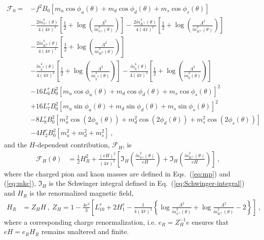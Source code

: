 \documentclass[12pt]{elsarticle}
\begin{document}
\begin{equation}
\begin{split}
\label{eq:F0}
\mathcal{F}_{0}=&-f^{2}B_{0}[m_{u}\cos\phi_{u}(\theta)+m_{d}\cos\phi_{d}(\theta)+m_{s}\cos\phi_{s}(\theta)]\\
&-\frac{2\mathring{m}^{4}_{\pi^{\pm}}(\theta)}{4(4\pi)^{2}}\left [\frac{1}{2}+\log\left (\frac{\Lambda^{2}}{\mathring{m}_{\pi^{\pm}}^{2}(\theta)} \right ) \right ]-\frac{2\mathring{m}_{K^{\pm}}^{4}(\theta)}{4(4\pi)^{2}}\left [\frac{1}{2}+\log\left (\frac{\Lambda^{2}}{\mathring{m}_{K^{\pm}}^{2}(\theta)} \right ) \right ]\\
&-\frac{2\mathring{m}_{K^{0}}^{4}(\theta)}{4(4\pi)^{2}}\left [\frac{1}{2}+\log\left (\frac{\Lambda^{2}}{\mathring{m}_{K^{0}}^{2}(\theta)} \right ) \right ]\\
&-\frac{\mathring{m}_{\tilde{\pi}^{0}}^{4}(\theta)}{4(4\pi)^{2}}\left [\frac{1}{2}+\log\left (\frac{\Lambda^{2}}{\mathring{m}_{\tilde{\pi}^{0}}^{2}(\theta)} \right ) \right ]-\frac{\mathring{m}_{\tilde{\eta}}^{4}(\theta)}{4(4\pi)^{2}}\left [\frac{1}{2}+\log\left (\frac{\Lambda^{2}}{\mathring{m}_{\tilde{\eta}}^{2}(\theta)} \right ) \right ]\\
&-16L^{r}_{6}B_{0}^{2}[m_{u}\cos\phi_{u}(\theta)+m_{d}\cos\phi_{d}(\theta)+m_{s}\cos\phi_{s}(\theta)]^{2}\\
&+16L^{r}_{7}B_{0}^{2}[m_{u}\sin\phi_{u}(\theta)+m_{d}\sin\phi_{d}(\theta)+m_{s}\sin\phi_{s}(\theta)]^{2}\\
&-8L^{r}_{8}B_{0}^{2}\left[m_{u}^{2}\cos(2\phi_{u}(\theta))+m_{d}^{2}\cos(2\phi_{d}(\theta))+m_{s}^{2}\cos(2\phi_{s}(\theta))\right]\\
&-4H^{r}_{2}B_{0}^{2}\left[m_{u}^{2}+m_{d}^{2}+m_{s}^{2}\right]\ ,
\end{split}
\end{equation}
and the $H$-dependent contribution, $\mathcal{F}_{H}$, is
\begin{equation}
\begin{split}
\label{eq:FH}
\mathcal{F}_{H}(\theta)&=\frac{1}{2}H_{R}^{2}+\frac{(eH)^{2}}{(4\pi)^{2}}\left[\mathfrak{I}_{H}(\tfrac{\mathring{m}_{\pi^{\pm}}^{2}(\theta)}{eH})+\mathfrak{I}_{H}(\tfrac{\mathring{m}_{K^{\pm}}^{2}(\theta)}{eH})\right]\ ,
\end{split}
\end{equation}
where the charged pion and kaon masses are defined in Eqs.~(\ref{eq:mp}) and (\ref{eq:mkc}), $\mathfrak{I}_{H}$ is the Schwinger integral defined in Eq.~(\ref{eq:Schwinger-integral}) and $H_{R}$ is the renormalized magnetic field,
\begin{equation}
\begin{split}
H_{R}&=Z_{H}H\ ,\ Z_{H}=1-\frac{4e^{2}}{3}\left [L^{r}_{10}+2H^{r}_{1}-\frac{1}{4(4\pi)^{2}}\left\{\log\frac{\Lambda^{2}}{\mathring{m}_{\pi^{\pm}}^{2}(\theta)}+\log\frac{\Lambda^{2}}{\mathring{m}_{K^{\pm}}^{2}(\theta)}-2\right\}\right ]\ ,
\end{split}
\end{equation}
where a corresponding charge renormalization, i.e. $e_{R}=Z_{H}^{-1}e$ ensures that $eH=e_{R}H_{R}$ remains unaltered and finite.
\end{document}

